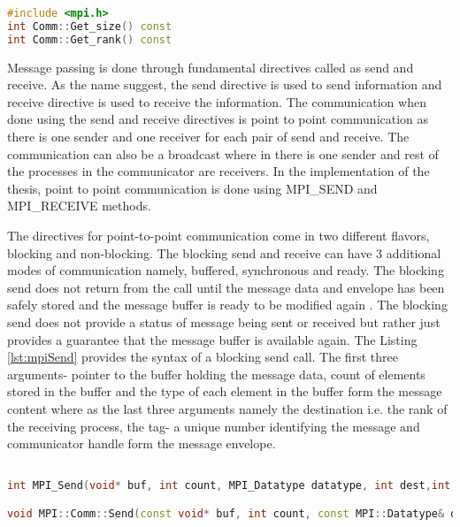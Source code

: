 \begin{lstlisting}[language=C++,label={lst:mpicommSizeRank},caption={MPI Query Functions}]
#include <mpi.h>
int Comm::Get_size() const
int Comm::Get_rank() const
\end{lstlisting}

Message passing is done through fundamental directives called as send and receive. As the name suggest, the send directive is used to send information and receive directive is used to receive the information. The communication when done using the send and receive directives is point to point communication as there is one sender and one receiver for each pair of send and receive. The communication can also be a broadcast where in there is one sender and rest of the processes in the communicator are receivers. In the implementation of the thesis, point to point communication is done using MPI\_SEND and MPI\_RECEIVE methods. \newline

The directives for point-to-point communication come in two different flavors, blocking and non-blocking. The blocking send and receive can have 3 additional modes of communication namely, buffered, synchronous and ready. The blocking send does not return from the call until the message data and envelope has been safely stored and the message buffer is ready to be modified again \cite{mpiMech}. The blocking send does not provide a status of message being sent or received but rather just provides a guarantee that the message buffer is available again.  The Listing \ref{lst:mpiSend} provides the syntax of a blocking send call. The first three arguments- pointer to the buffer holding the message data, count of elements stored in the buffer and the type of each element in the buffer form the message content where as the last three arguments namely the destination i.e. the rank of the receiving process, the tag- a unique number identifying the message and communicator handle form the message envelope. \newline  

\begin{lstlisting}[language=C++,label={lst:mpiSend},caption={Blocking MPI Send}]

int MPI_Send(void* buf, int count, MPI_Datatype datatype, int dest,int tag, MPI_Comm comm)

void MPI::Comm::Send(const void* buf, int count, const MPI::Datatype& datatype, int dest, int tag) const  	
\end{lstlisting}

